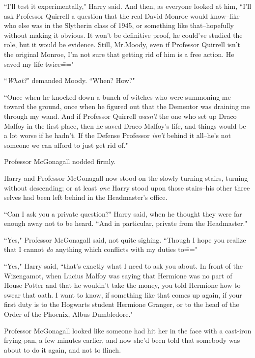 ``I'll test it experimentally," Harry said. And then, as everyone looked at him, ``I'll ask Professor Quirrell a question that the real David Monroe would know\---like who else was in the Slytherin class of 1945, or something like that\---hopefully without making it obvious. It won't be definitive proof, he could've studied the role, but it would be evidence. Still, Mr.\?Moody, even if Professor Quirrell isn't the original Monroe, I'm not sure that getting rid of him is a free action. He saved my life twice\==="

``\emph{What?}" demanded Moody. ``When? How?"

``Once when he knocked down a bunch of witches who were summoning me toward the ground, once when he figured out that the Dementor was draining me through my wand. And if Professor Quirrell \emph{wasn't} the one who set up Draco Malfoy in the first place, then he saved Draco Malfoy's life, and things would be a lot worse if he hadn't. If the Defense Professor \emph{isn't} behind it all\---he's not someone we can afford to just get rid of."

Professor McGonagall nodded firmly.


Harry and Professor McGonagall now stood on the slowly turning stairs, turning without descending; or at least \emph{one} Harry stood upon those stairs\---his other three selves had been left behind in the Headmaster's office.

``Can I ask you a private question?" Harry said, when he thought they were far enough away not to be heard. ``And in particular, private from the Headmaster."

``Yes," Professor McGonagall said, not quite sighing. ``Though I hope you realize that I cannot \emph{do} anything which conflicts with my duties to\==="

``Yes," Harry said, ``that's exactly what I need to ask you about. In front of the Wizengamot, when Lucius Malfoy was saying that Hermione was no part of House Potter and that he wouldn't take the money, you told Hermione how to swear that oath. I want to know, if something like that comes up again, if your first duty is to the Hogwarts student Hermione Granger, or to the head of the Order of the Phoenix, Albus Dumbledore."

Professor McGonagall looked like someone had hit her in the face with a cast-iron frying-pan, a few minutes earlier, and now she'd been told that somebody was about to do it again, and not to flinch.

